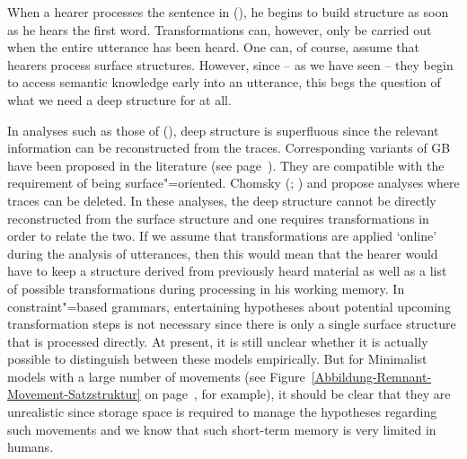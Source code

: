 When a hearer processes the sentence in (), he begins to build structure as soon as he hears the first word.
Transformations can, however, only be carried out when the entire utterance has been heard.
One can, of course, assume that hearers process surface structures. However, since  -- as we have seen -- they begin to access semantic knowledge
early into an utterance, this begs the question of what we need a deep structure for at all.

In analyses such as those of (), deep structure is superfluous since the relevant information can be reconstructed
from the traces. Corresponding variants of GB have been proposed in the literature (see page~\pageref{Seite-Representationelle-GB}).
They are compatible with the requirement of being surface"=oriented.
 Chomsky (\citeyear[]{Chomsky81a}; \citeyear[]{Chomsky86b}) and
\citet[--60]{LS92a-u} propose analyses where traces can be deleted. In these analyses,
the deep structure cannot be directly reconstructed from the surface structure and one requires transformations
in order to relate the two.
If we assume that transformations are applied `online' during the analysis of utterances, then this would mean that the
hearer would have to keep a structure derived from previously heard material as well as a list of possible transformations
during processing in his working memory. In constraint"=based grammars, entertaining hypotheses about potential upcoming transformation steps is not
necessary since there is only a single surface structure that is processed directly.
At present, it is still unclear whether it is actually possible to distinguish between these models empirically.
But for Minimalist models with a large number of movements (see Figure~\ref{Abbildung-Remnant-Movement-Satzstruktur}
on page~\pageref{Abbildung-Remnant-Movement-Satzstruktur}, for example), it should be clear that
they are unrealistic since storage space is required to manage the hypotheses regarding such
movements and we know that such short-term memory is very limited in humans.

